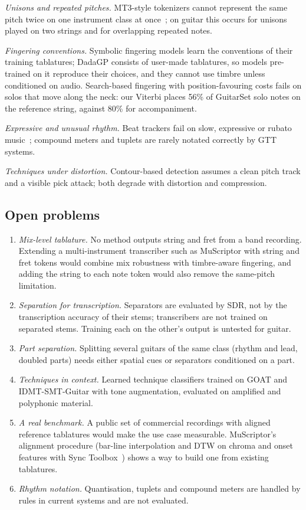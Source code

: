 \emph{Unisons and repeated pitches.} MT3-style tokenizers cannot represent the
same pitch twice on one instrument class at once~\cite{rouard2026muscriptor};
on guitar this occurs for unisons played on two strings and for overlapping
repeated notes.

\emph{Fingering conventions.} Symbolic fingering models learn the conventions
of their training tablatures; DadaGP consists of user-made tablatures, so
models pre-trained on it reproduce their choices, and they cannot use
timbre unless conditioned on audio. Search-based fingering with
position-favouring costs fails on solos that move along the neck: our
Viterbi places 56\% of GuitarSet solo notes on the reference string, against
80\% for accompaniment.

\emph{Expressive and unusual rhythm.} Beat trackers fail on slow, expressive
or rubato music~\cite{ahn2026smc}; compound meters and tuplets are rarely
notated correctly by GTT systems.

\emph{Techniques under distortion.} Contour-based detection assumes a clean
pitch track and a visible pick attack; both degrade with distortion and
compression.

\subsection{Open problems}
\begin{enumerate}
\item \emph{Mix-level tablature.} No method outputs string and fret from a
band recording. Extending a multi-instrument transcriber such as MuScriptor
with string and fret tokens would combine mix robustness with timbre-aware
fingering, and adding the string to each note token would also remove the
same-pitch limitation.
\item \emph{Separation for transcription.} Separators are evaluated by SDR,
not by the transcription accuracy of their stems; transcribers are not
trained on separated stems. Training each on the other's output is untested
for guitar.
\item \emph{Part separation.} Splitting several guitars of the same class
(rhythm and lead, doubled parts) needs either spatial cues or separators
conditioned on a part.
\item \emph{Techniques in context.} Learned technique classifiers trained on
GOAT and IDMT-SMT-Guitar with tone augmentation, evaluated on amplified and
polyphonic material.
\item \emph{A real benchmark.} A public set of commercial recordings with
aligned reference tablatures would make the use case measurable. MuScriptor's
alignment procedure (bar-line interpolation and DTW on chroma and onset
features with Sync Toolbox~\cite{muller2021sync}) shows a way to build one
from existing tablatures.
\item \emph{Rhythm notation.} Quantisation, tuplets and compound meters are
handled by rules in current systems and are not evaluated.
\end{enumerate}
